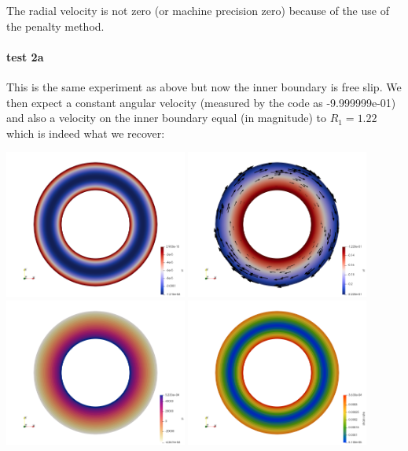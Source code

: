 The radial velocity is not zero (or machine precision zero) because of the use of the 
penalty method. 

\paragraph{test 2a}
This is the same experiment as above but now the inner boundary is free slip. We then 
expect a constant angular velocity (measured by the code as  -9.999999e-01)  
and also a velocity on the inner boundary equal (in magnitude) to $R_1=1.22$ which is 
indeed what we recover:  

\begin{center}
\includegraphics[width=6cm]{python_codes/fieldstone_33/results_test2/vr}
\includegraphics[width=6cm]{python_codes/fieldstone_33/results_test2/vt}\\
\includegraphics[width=6cm]{python_codes/fieldstone_33/results_test2/p}
\includegraphics[width=6cm]{python_codes/fieldstone_33/results_test2/sr}
\end{center}

